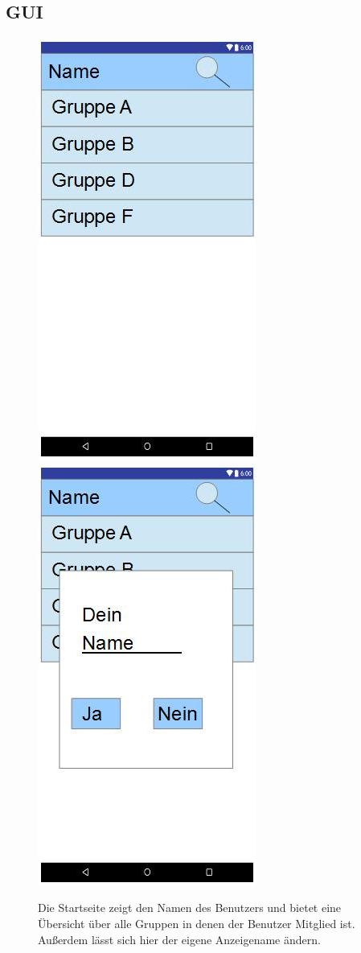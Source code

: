 \documentclass{scrartcl}
\begin{document}
	\subsection{GUI}
	\begin{figure}[h]
		\includegraphics[width=.5\textwidth]{GUI_Start.jpg}
		\includegraphics[width=.5\textwidth]{GUI_changeName.jpg}
		\caption{Die Startseite zeigt den Namen des Benutzers und bietet eine Übersicht über alle Gruppen in denen der Benutzer Mitglied ist. Außerdem lässt sich hier der eigene Anzeigename ändern.}
	\end{figure}
	
\end{document}
